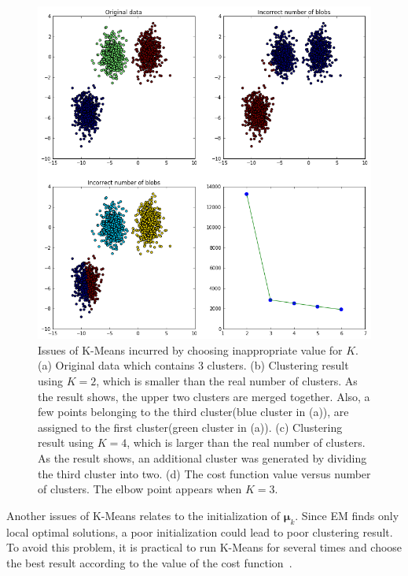 \begin{figure}
	\begin{center}
		\includegraphics[width=\textwidth]{images/KMeansIncorrectNumber.png}
		\caption{Issues of K-Means incurred by choosing inappropriate value for \(K\). (a) Original data which contains 3 clusters. (b) Clustering result using $K = 2$, which is smaller than the real number of clusters. As the result shows, the upper two clusters are merged together. Also, a few points belonging to the third cluster(blue cluster in (a)), are assigned to the first cluster(green cluster in (a)). (c) Clustering result using $K = 4$, which is larger than the real number of clusters. As the result shows, an additional cluster was generated by dividing the third cluster into two. (d) The cost function value versus number of clusters. The elbow point appears when $K = 3$.}
		\label{fig:KMeansIssue}
	\end{center}
\end{figure}

Another issues of K-Means relates to the initialization of \(\boldsymbol{\mu}_k\). Since EM finds only local optimal solutions, a poor initialization could lead to poor clustering result. To avoid this problem, it is practical to run K-Means for several times and choose the best result according to the value of the cost function~\cite{PRML}.

